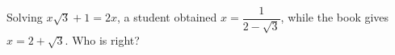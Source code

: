 Solving $x\sqrt3+1=2x$, a student obtained $x=\dfrac{1}{2-\sqrt3}$, while the book gives $x=2+\sqrt3$. Who is right?
